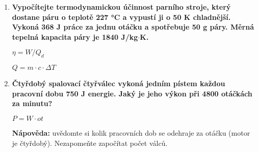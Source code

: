 \documentclass[../main.tex]{subfiles}
\begin{document}
\begin{enumerate}[label={\textbf{\arabic*.}}, resume]

    \item \textbf{Vypočítejte termodynamickou účinnost parního stroje, který dostane páru o teplotě 227 °C a vypustí ji o 50 K chladnější. Vykoná 368 J práce za jednu otáčku a spotřebuje 50 g páry. Měrná tepelná kapacita páry je 1840 J/kg\(\cdot\)K.}
    \vspace{-0.75cm}
    \begin{flushright}
        \begin{minipage}{0.16\textwidth}
            \begin{tcolorbox}[colframe=black, colback=white, boxrule=0.6pt]
                {$\eta=W/Q_d$}
            \end{tcolorbox}
        \end{minipage}
        \begin{minipage}{0.18\textwidth}
            \begin{tcolorbox}[colframe=black, colback=white, boxrule=0.6pt]
                {$Q=m\cdot{c}\cdot{\Delta{T}}$}
            \end{tcolorbox}
        \end{minipage}
    \end{flushright}
    \vspace{4cm}
    \item \textbf{Čtyřdobý spalovací čtyřválec vykoná jedním pístem každou pracovní dobu 750 J energie. Jaký je jeho výkon při 4800 otáčkách za minutu?}
    \vspace{-0.75cm}
    \begin{flushright}
        \begin{minipage}{0.16\textwidth}
            \begin{tcolorbox}[colframe=black, colback=white, boxrule=0.6pt]
                {$P=W\cdot{ot}$}
            \end{tcolorbox}
        \end{minipage}
    \end{flushright}
    \vspace{4cm}
    \begin{minipage}{0.7\textwidth}
        \small{\textbf{Nápověda: }uvědomte si kolik pracovních dob se odehraje za otáčku (motor je čtyřdobý). Nezapomeňte započítat počet válců.}
    \end{minipage}
    \hfill
    \begin{minipage}{0.25\textwidth}
    \end{minipage}


\end{enumerate}
\end{document}
